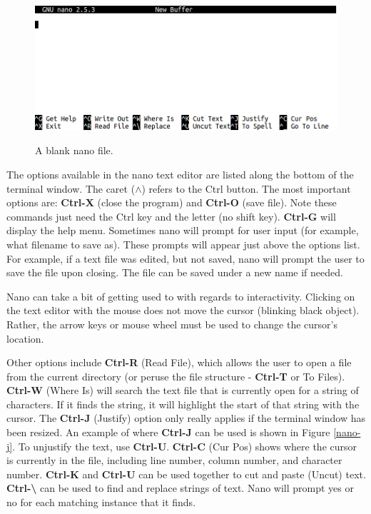 \documentclass[12pt]{article}
\begin{document}
\begin{figure}[H]
\centering
\caption{A blank nano file.}
\includegraphics[width=\textwidth]{nano-blank}
\label{nano-b}
\end{figure} 
\quad\enskip\quad The options available in the nano text editor are listed along the bottom of the terminal window. The caret ($\wedge$) refers to the Ctrl button. The most important options are: \textbf{Ctrl-X} (close the program) and \textbf{Ctrl-O} (save file). Note these commands just need the Ctrl key and the letter (no shift key). \textbf{Ctrl-G} will display the help menu. Sometimes nano will prompt for user input (for example, what filename to save as). These prompts will appear just above the options list. For example, if a text file was edited, but not saved, nano will prompt the user to save the file upon closing. The file can be saved under a new name if needed. 

\quad Nano can take a bit of getting used to with regards to interactivity. Clicking on the text editor with the mouse does not move the cursor (blinking black object). Rather, the arrow keys or mouse wheel must be used to change the cursor's location.

\quad Other options include \textbf{Ctrl-R} (Read File), which allows the user to open a file from the current directory (or peruse the file structure - \textbf{Ctrl-T} or To Files). \textbf{Ctrl-W} (Where Is) will search the text file that is currently open for a string of characters. If it finds the string, it will highlight the start of that string with the cursor. The \textbf{Ctrl-J} (Justify) option only really applies if the terminal window has been resized. An example of where \textbf{Ctrl-J} can be used is shown in Figure \ref{nano-j}. To unjustify the text, use \textbf{Ctrl-U}. \textbf{Ctrl-C} (Cur Pos) shows where the cursor is currently in the file, including line number, column number, and character number. \textbf{Ctrl-K} and \textbf{Ctrl-U} can be used together to cut and paste (Uncut) text. \textbf{Ctrl-\textbackslash} can be used to find and replace strings of text. Nano will prompt yes or no for each matching instance that it finds.
\end{document}
